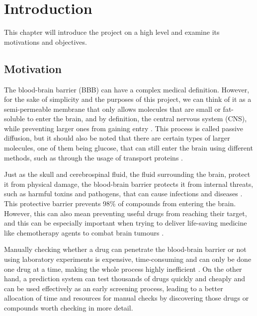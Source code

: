 \chapter{Introduction}




This chapter will introduce the project on a high level and examine its motivations and objectives.

\section{Motivation}
\label{sec:Motivation}

The blood-brain barrier (BBB) can have a complex medical definition. However, for the sake of simplicity and the purposes of this project, we can think of it as a semi-permeable membrane that only allows molecules that are small or fat-soluble to enter the brain, and by definition, the central nervous system (CNS), while preventing larger ones from gaining entry \citep{Woodruff2017}. This process is called passive diffusion, but it should also be noted that there are certain types of larger molecules, one of them being glucose, that can still enter the brain using different methods, such as through the usage of transport proteins \citep{Woodruff2017, Gao2017}.

Just as the skull and cerebrospinal fluid, the fluid surrounding the brain, protect it from physical damage, the blood-brain barrier protects it from internal threats, such as harmful toxins and pathogens, that can cause infections and diseases \citep{Woodruff2017}. This protective barrier prevents 98\% of compounds from entering the brain. However, this can also mean preventing useful drugs from reaching their target, and this can be especially important when trying to deliver life-saving medicine like chemotherapy agents to combat brain tumours \citep{Gao2017}.

Manually checking whether a drug can penetrate the blood-brain barrier or not using laboratory experiments is expensive, time-consuming and can only be done one drug at a time, making the whole process highly inefficient \citep{Singh2020}. On the other hand, a prediction system can test thousands of drugs quickly and cheaply and can be used effectively as an early screening process, leading to a better allocation of time and resources for manual checks by discovering those drugs or compounds worth checking in more detail.

